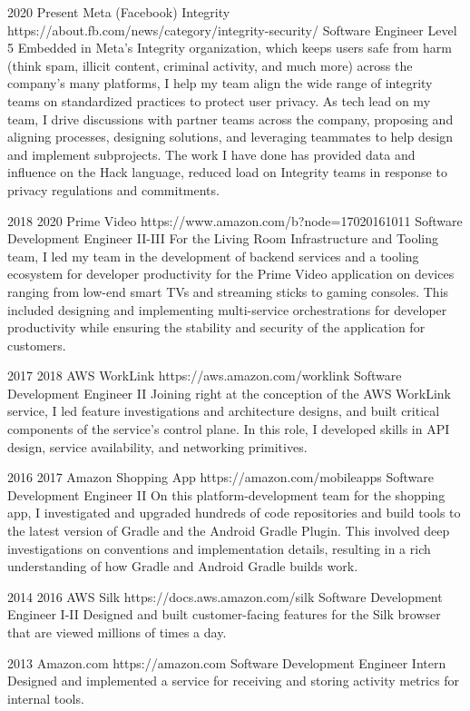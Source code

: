 \job
{2020} {Present}
{Meta (Facebook) Integrity} {https://about.fb.com/news/category/integrity-security/}
{Software Engineer Level 5}
{
    Embedded in Meta's Integrity organization, which keeps users safe from harm (think spam, illicit content, criminal activity, and much more) across the company's many platforms, I help my team align the wide range of integrity teams on standardized practices to protect user privacy. As tech lead on my team, I drive discussions with partner teams across the company, proposing and aligning processes, designing solutions, and leveraging teammates to help design and implement subprojects. The work I have done has provided data and influence on the  {Hack language}, reduced load on Integrity teams in response to  {privacy regulations and commitments}.
}

\job
{2018} {2020}
{Prime Video} {https://www.amazon.com/b?node=17020161011}
{Software Development Engineer II-III}
{
    For the Living Room Infrastructure and Tooling team, I led my team in the development of backend services and a tooling ecosystem for developer productivity for the Prime Video application on devices ranging from low-end smart TVs and streaming sticks to gaming consoles. This included designing and implementing multi-service orchestrations for developer productivity while ensuring the stability and security of the application for customers.
}

\job
{2017} {2018}
{AWS WorkLink} {https://aws.amazon.com/worklink}
{Software Development Engineer II}
{
    Joining right at the conception of the AWS WorkLink service, I led feature investigations and architecture designs, and built critical components of the service's control plane. In this role, I developed skills in API design, service availability, and networking primitives.
}

\job
{2016} {2017}
{Amazon Shopping App} {https://amazon.com/mobileapps}
{Software Development Engineer II}
{
    On this platform-development team for the shopping app, I investigated and upgraded hundreds of code repositories and build tools to the latest version of  {Gradle} and the  {Android Gradle Plugin}. This involved deep investigations on conventions and implementation details, resulting in a rich understanding of how Gradle and Android Gradle builds work.
}

\job
{2014} {2016}
{AWS Silk} {https://docs.aws.amazon.com/silk}
{Software Development Engineer I-II}
{
    Designed and built customer-facing features for the Silk browser that are viewed millions of times a day.
}

\job
{2013} {}
{Amazon.com} {https://amazon.com}
{Software Development Engineer Intern}
{
    Designed and implemented a service for receiving and storing activity metrics for internal tools.
}
